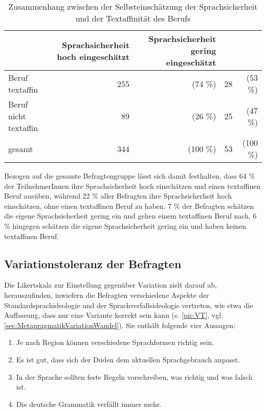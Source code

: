 \begin{table}
\centering
\begin{tabular}{lrrrr}
\multicolumn{1}{c}{\textbf{}} & Sprachsicherheit hoch eingeschätzt & Sprachsicherheit gering eingeschätzt \\
\midrule
Beruf textaffin               & 255                                             & (74 \%)                                             & 28                                               & (53 \%)                                               \\
Beruf nicht textaffin         & 89                                              & (26 \%)                                             & 25                                               & (47 \%)                                               \\
gesamt                        & 344                                             & (100 \%)                                            & 53                                               & (100 \%)                                              \\ 
\end{tabular}
\caption{Zusammenhang zwischen der Selbsteinschätzung der Sprachsicherheit und der Textaffinität des Berufs}
\label{table:SprachwissenundBeruf}
\end{table}

Bezogen auf die gesamte Befragtengruppe lässt sich damit festhalten, dass 64 \% der TeilnehmerInnen ihre Sprachsicherheit hoch einschätzen und einen textaffinen Beruf ausüben, während 22 \% aller Befragten ihre Sprachsicherheit hoch einschätzen, ohne einen textaffinen Beruf zu haben.
7 \% der Befragten schätzen die eigene Sprachsicherheit gering ein und gehen einem textaffinen Beruf nach, 6 \% hingegen schätzen die eigene Sprachsicherheit gering ein und haben keinen textaffinen Beruf. %
\subsection{Variationstoleranz der Befragten}
\label{sec:Variationstoleranz}
Die Likertskala zur Einstellung gegenüber Variation zielt darauf ab, herauszufinden, inwiefern die Befragten verschiedene Aspekte der Standardsprachideologie und der Sprachverfallsideologie vertreten, wie etwa die Auffassung, dass nur eine Variante korrekt sein kann (s. \autoref{pic:VT}, vgl. \autoref{sec:MetapragmatikVariationWandel}). 
Sie enthält folgende vier Aussagen: 
\begin{enumerate}
\item Je nach Region können verschiedene Sprachformen richtig sein. 
\item Es ist gut, dass sich der Duden dem aktuellen Sprachgebrauch anpasst.
\item In der Sprache sollten feste Regeln vorschreiben, was richtig und was falsch ist. 
\item Die deutsche Grammatik verfällt immer mehr. 
\end{enumerate}

